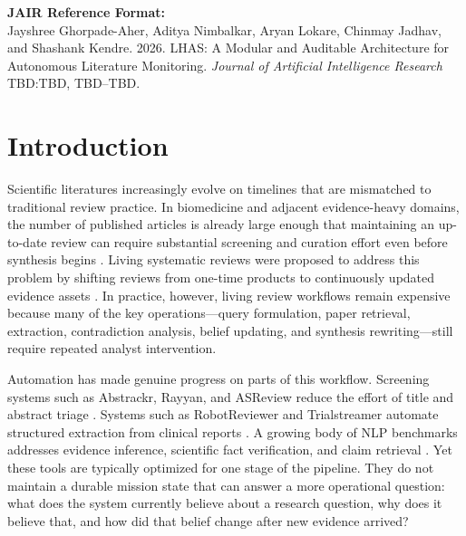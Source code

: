 \documentclass[manuscript,screen,review]{jair}
\begin{document}
\begin{center}
\textbf{JAIR Reference Format:}\\
Jayshree Ghorpade-Aher, Aditya Nimbalkar, Aryan Lokare, Chinmay Jadhav, and Shashank Kendre. 2026. LHAS: A Modular and Auditable Architecture for Autonomous Literature Monitoring. \textit{Journal of Artificial Intelligence Research} TBD:TBD, TBD--TBD.
\end{center}


\maketitle

\section{Introduction}
Scientific literatures increasingly evolve on timelines that are mismatched to traditional review practice. In biomedicine and adjacent evidence-heavy domains, the number of published articles is already large enough that maintaining an up-to-date review can require substantial screening and curation effort even before synthesis begins \citep{Bastian2010}. Living systematic reviews were proposed to address this problem by shifting reviews from one-time products to continuously updated evidence assets \citep{Elliott2017}. In practice, however, living review workflows remain expensive because many of the key operations---query formulation, paper retrieval, extraction, contradiction analysis, belief updating, and synthesis rewriting---still require repeated analyst intervention.

Automation has made genuine progress on parts of this workflow. Screening systems such as Abstrackr, Rayyan, and ASReview reduce the effort of title and abstract triage \citep{Wallace2012,Ouzzani2016,vanDeSchoot2021}. Systems such as RobotReviewer and Trialstreamer automate structured extraction from clinical reports \citep{Marshall2016,Marshall2020}. A growing body of NLP benchmarks addresses evidence inference, scientific fact verification, and claim retrieval \citep{Nye2018,DeYoung2020,Wadden2020}. Yet these tools are typically optimized for one stage of the pipeline. They do not maintain a durable mission state that can answer a more operational question: what does the system currently believe about a research question, why does it believe that, and how did that belief change after new evidence arrived?
\end{document}
